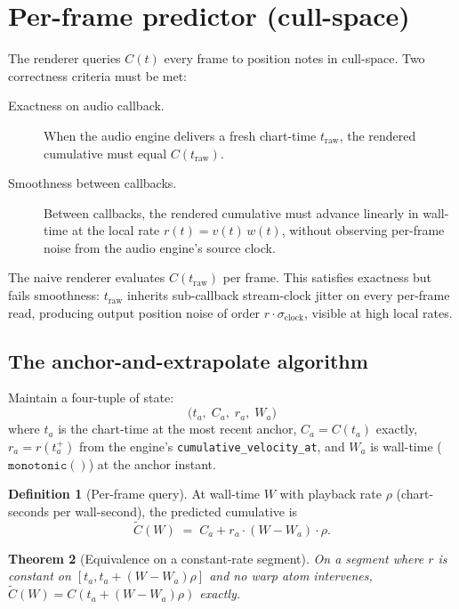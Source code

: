 \documentclass[11pt]{article}
\newtheorem{theorem}{Theorem}
\theoremstyle{definition}
\newtheorem{definition}[theorem]{Definition}
\begin{document}
\section{Per-frame predictor (cull-space)}
\label{sec:predictor}

The renderer queries $C(t)$ every frame to position notes in cull-space.
Two correctness criteria must be met:

\begin{description}
    \item[Exactness on audio callback.] When the audio engine delivers a
        fresh chart-time $t_{\mathrm{raw}}$, the rendered cumulative must
        equal $C(t_{\mathrm{raw}})$.
    \item[Smoothness between callbacks.] Between callbacks, the rendered
        cumulative must advance linearly in wall-time at the local rate
        $r(t) = v(t)\,w(t)$, without observing per-frame noise from the
        audio engine's source clock.
\end{description}

The naive renderer evaluates $C(t_{\mathrm{raw}})$ per frame. This
satisfies exactness but fails smoothness: $t_{\mathrm{raw}}$ inherits
sub-callback stream-clock jitter on every per-frame read, producing
output position noise of order $r \cdot \sigma_{\mathrm{clock}}$, visible
at high local rates.

\subsection{The anchor-and-extrapolate algorithm}

Maintain a four-tuple of state:
\[
\bigl(t_a,\; C_a,\; r_a,\; W_a\bigr)
\]
where $t_a$ is the chart-time at the most recent anchor,
$C_a = C(t_a)$ exactly, $r_a = r(t_a^+)$ from the engine's
\texttt{cumulative\_velocity\_at}, and $W_a$ is wall-time
($\mathtt{monotonic()}$) at the anchor instant.

\begin{definition}[Per-frame query]
\label{def:query}
At wall-time $W$ with playback rate $\rho$ (chart-seconds per
wall-second), the predicted cumulative is
\begin{equation}
\label{eq:predict}
\widetilde{C}(W) \;=\; C_a + r_a \cdot (W - W_a) \cdot \rho.
\end{equation}
\end{definition}

\begin{theorem}[Equivalence on a constant-rate segment]
\label{thm:predictor-equiv}
On a segment where $r$ is constant on $[t_a, t_a + (W - W_a)\rho]$ and no
warp atom intervenes, $\widetilde{C}(W) = C(t_a + (W - W_a)\rho)$ exactly.
\end{theorem}
\end{document}
